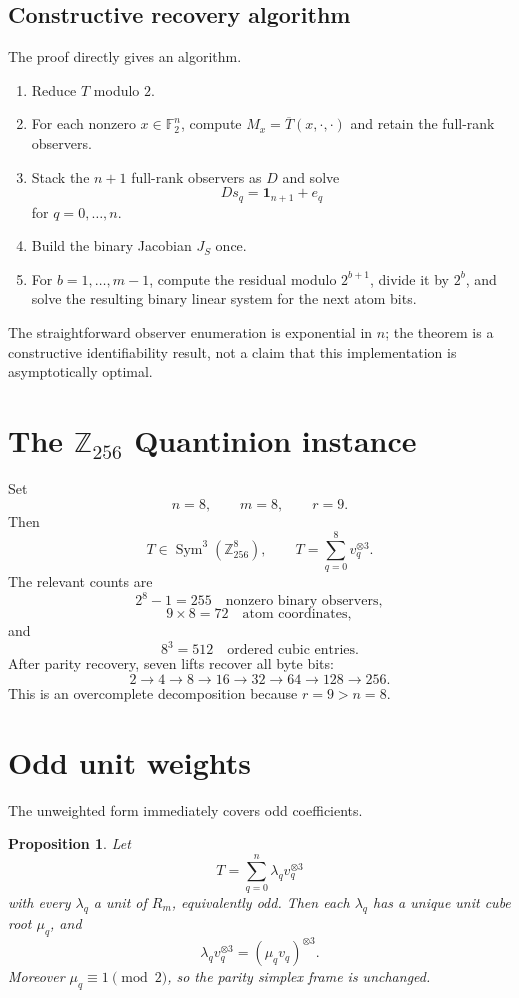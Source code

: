 \documentclass[11pt]{article}
\newtheorem{proposition}[theorem]{Proposition}
\theoremstyle{definition}
\newcommand{\F}{\mathbb{F}}
\newcommand{\Z}{\mathbb{Z}}
\newcommand{\one}{\mathbf{1}}
\newcommand{\Sym}{\operatorname{Sym}}
\begin{document}
\subsection{Constructive recovery algorithm}
The proof directly gives an algorithm.
\begin{enumerate}[leftmargin=*]
  \item Reduce $T$ modulo $2$.
  \item For each nonzero $x\in\F_2^n$, compute $M_x=\overline{T}(x,\cdot,\cdot)$ and retain the full-rank observers.
  \item Stack the $n+1$ full-rank observers as $D$ and solve
  \[
  Ds_q=\one_{n+1}+e_q
  \]
  for $q=0,\ldots,n$.
  \item Build the binary Jacobian $J_S$ once.
  \item For $b=1,\ldots,m-1$, compute the residual modulo $2^{b+1}$, divide it by $2^b$, and solve the resulting binary linear system for the next atom bits.
\end{enumerate}
The straightforward observer enumeration is exponential in $n$; the theorem is a constructive identifiability result, not a claim that this implementation is asymptotically optimal.

\section{The $\Z_{256}$ Quantinion instance}
Set
\[
n=8,\qquad m=8,\qquad r=9.
\]
Then
\[
T\in\Sym^3(\Z_{256}^8),\qquad T=\sum_{q=0}^{8}v_q^{\otimes3}.
\]
The relevant counts are
\[
2^8-1=255\quad\text{nonzero binary observers},
\]
\[
9\times8=72\quad\text{atom coordinates},
\]
and
\[
8^3=512\quad\text{ordered cubic entries}.
\]
After parity recovery, seven lifts recover all byte bits:
\[
2\to4\to8\to16\to32\to64\to128\to256.
\]
This is an overcomplete decomposition because $r=9>n=8$.

\section{Odd unit weights}
The unweighted form immediately covers odd coefficients.

\begin{proposition}\label{prop:weights}
Let
\[
T=\sum_{q=0}^{n}\lambda_q v_q^{\otimes3}
\]
with every $\lambda_q$ a unit of $R_m$, equivalently odd. Then each $\lambda_q$ has a unique unit cube root $\mu_q$, and
\[
\lambda_qv_q^{\otimes3}=(\mu_qv_q)^{\otimes3}.
\]
Moreover $\mu_q\equiv1\pmod2$, so the parity simplex frame is unchanged.
\end{proposition}
\end{document}
